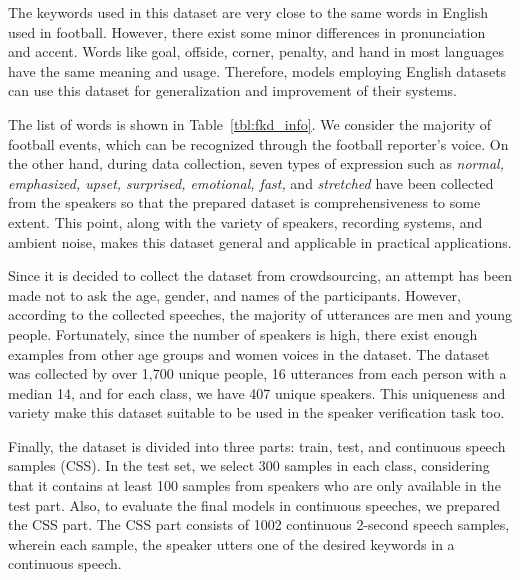 \documentclass{article}
\begin{document}
The keywords used in this dataset are very close to the same words in English used in football. However, there exist some minor differences in pronunciation and accent. Words like goal, offside, corner, penalty, and hand in most languages have the same meaning and usage. Therefore, models employing English datasets can use this dataset for generalization and improvement of their systems.

The list of words is shown in Table~\ref{tbl:fkd_info}. We consider the majority of football events, which can be recognized through the football reporter's voice. On the other hand, during data collection, seven types of expression such as \textit{normal, emphasized, upset, surprised, emotional, fast,} and \textit{stretched} have been collected from the speakers so that the prepared dataset is comprehensiveness to some extent. This point, along with the variety of speakers, recording systems, and ambient noise, makes this dataset general and applicable in practical applications.

Since it is decided to collect the dataset from crowdsourcing, an attempt has been made not to ask the age, gender, and names of the participants. However, according to the collected speeches, the majority of utterances are men and young people. Fortunately, since the number of speakers is high, there exist enough examples from other age groups and women voices in the dataset. The dataset was collected by over 1,700 unique people,  16 utterances from each person with a median 14, and for each class, we have 407 unique speakers. This uniqueness and variety make this dataset suitable to be used in the speaker verification task too.

Finally, the dataset is divided into three parts: train, test, and continuous speech samples (CSS). In the test set, we select 300 samples in each class, considering that it contains at least 100 samples from speakers who are only available in the test part. Also, to evaluate the final models in continuous speeches, we prepared the CSS part. The CSS part consists of 1002 continuous 2-second speech samples, wherein each sample, the speaker utters one of the desired keywords in a continuous speech.
\end{document}
